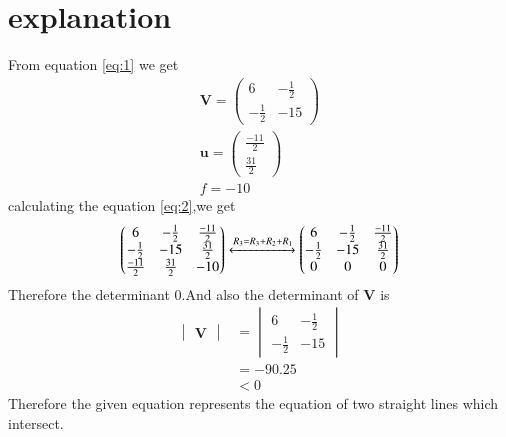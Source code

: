\documentclass[journal,12pt,twocolumn]{IEEEtran}
\newcommand{\myvec}[1]{\ensuremath{\begin{pmatrix}#1\end{pmatrix}}}
\newcommand{\mydet}[1]{\ensuremath{\begin{vmatrix}#1\end{vmatrix}}}
\numberwithin{equation}{subsection}
\let\vec\mathbf
\begin{document}
\section{explanation}
From equation \eqref{eq:1} we get
\begin{align}
    \vec{V}=\myvec{6&-\frac{1}{2}\\-\frac{1}{2}&-15}\\
    \vec{u}=\myvec{\frac{-11}{2}\\ \frac{31}{2}}\\
    f=-10
\end{align}
calculating the equation \eqref{eq:2},we get
\begin{align}
    \myvec{6&-\frac{1}{2}&\frac{-11}{2}\\-\frac{1}{2}&-15&\frac{31}{2}\\\frac{-11}{2}&\frac{31}{2}&-10}\xleftrightarrow[]{R_3=R_3+R_2+R_1}\myvec{6&-\frac{1}{2}&\frac{-11}{2}\\-\frac{1}{2}&-15&\frac{31}{2}\\0&0&0}
\end{align}
Therefore the determinant $0$.And also the determinant of $\vec{V}$ is
\begin{align}
    \mydet{\vec{V}}&=\mydet{6&-\frac{1}{2}\\-\frac{1}{2}&-15}\\
    &=-90.25\\
    &<0
\end{align}
Therefore the given equation represents the equation of two straight lines which intersect.
\end{document}
